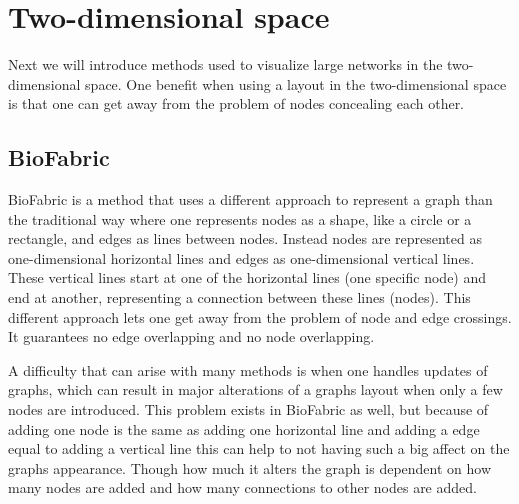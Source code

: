 \documentclass[a4paper,11pt]{kth-mag}
\begin{document}
\section{Two-dimensional space}
Next we will introduce methods used to visualize large networks in the two-dimensional space. One benefit when using a layout in 
the two-dimensional space is that one can get away from the problem of nodes concealing each other. 
\subsection{BioFabric}
BioFabric\cite{23102059} is a method that uses a different approach to represent a graph than the traditional way where one represents nodes
as a shape, like a circle or a rectangle, and edges as lines between nodes. Instead nodes are represented as one-dimensional
horizontal lines and edges as one-dimensional vertical lines. These vertical lines start at one of the horizontal lines (one specific node)
and end at another, representing a connection between these lines (nodes). This different approach lets one get away from the problem of node and edge crossings.
It guarantees no edge overlapping and no node overlapping.

A difficulty that can arise with many methods is when one handles updates of graphs, which can result in major alterations of a graphs layout when only a few nodes are introduced. 
This problem exists in BioFabric as well, but because of adding one node is the same as adding one horizontal line and adding a edge equal to adding a vertical line this can 
help to not having such a big affect on the graphs appearance. Though how much it alters the graph is dependent on how many nodes are added and how many connections to other nodes are
added.
\end{document}
